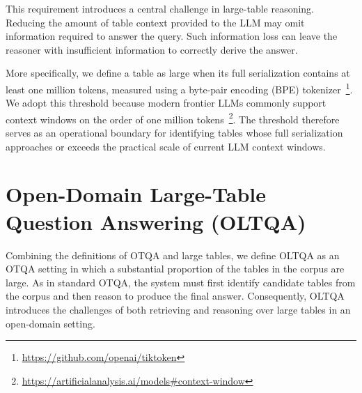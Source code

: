 This requirement introduces a central challenge in large-table reasoning.
Reducing the amount of table context provided to the LLM may omit information required to answer the query. Such information loss can leave the reasoner with insufficient information to correctly derive the answer.

More specifically, we define a table as large when its full serialization contains at least one million tokens, measured using a byte-pair encoding (BPE) tokenizer~\footnote{\url{https://github.com/openai/tiktoken}}.
We adopt this threshold because modern frontier LLMs commonly support context windows on the order of one million tokens~\footnote{\url{https://artificialanalysis.ai/models\#context-window}}.
The threshold therefore serves as an operational boundary for identifying tables whose full serialization approaches or exceeds the practical scale of current LLM context windows.



\section{Open-Domain Large-Table Question Answering (OLTQA)}
Combining the definitions of OTQA and large tables, we define OLTQA as an OTQA setting in which a substantial proportion of the tables in the corpus are large.
As in standard OTQA, the system must first identify candidate tables from the corpus and then reason to produce the final answer.
Consequently, OLTQA introduces the challenges of both retrieving and reasoning over large tables in an open-domain setting.
